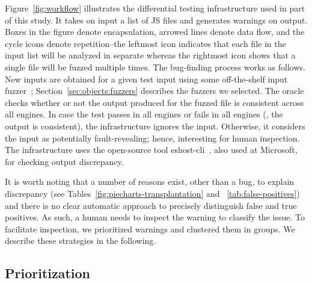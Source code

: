 \documentclass[10pt,conference,anonymous]{IEEEtran}
\begin{document}
Figure~\ref{fig:workflow} illustrates the 
differential testing infrastructure used in part of this study. It takes on
input a list of JS files and generates warnings on output. Boxes in
the figure denote encapsulation, arrowed lines denote data flow, and
the cycle icons denote repetition--the leftmost icon indicates that
each file in the input list will be analyzed in separate whereas the
rightmost icon shows that a single file will be fuzzed multiple times.
The bug-finding process works as follows. New inputs are obtained for
a given test input using some off-the-shelf input
fuzzer~\cite{fuzz-testing-history}; Section~\ref{sec:objects:fuzzers} describes the fuzzers we selected.
The oracle checks whether or not the output produced for the fuzzed
file is consistent across all engines. In case the test passes in all
engines or fails in all engines (\ie{}, the output is consistent), the
infrastructure ignores the input. Otherwise, it considers the input as
potentially fault-revealing; hence, interesting for human
inspection. The infrastructure uses the
open-source tool eshost-cli~\cite{eshost-cli}, also used at
Microsoft, for checking output discrepancy. 


It is worth noting that a number of reasons exist, other than a bug,
to explain discrepancy (see Tables~\ref{fig:piecharts-transplantation}
and ~\ref{tab:false-positives}) and there is no clear automatic
approach to precisely distinguish false and true positives. As such, a
human needs to inspect the warning to classify the issue. To
facilitate inspection, we prioritized warnings and clustered them in
groups. We describe these strategies in the following.

\subsection{Prioritization}
\end{document}
